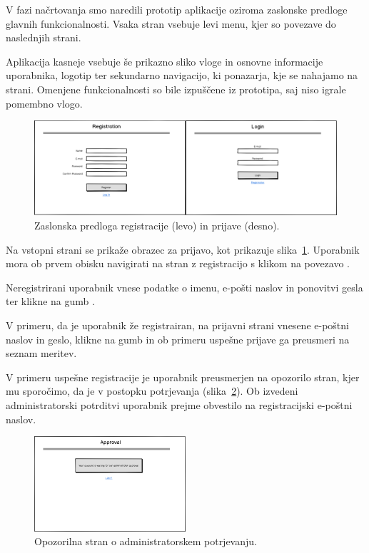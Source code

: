 \documentclass[a4paper, 12pt]{book}
\begin{document}
V fazi načrtovanja smo naredili prototip aplikacije oziroma zaslonske predloge glavnih funkcionalnosti. Vsaka stran vsebuje levi menu, kjer so povezave do naslednjih strani. 

Aplikacija kasneje vsebuje še prikazno sliko vloge in osnovne informacije uporabnika, logotip ter sekundarno navigacijo, ki ponazarja, kje se nahajamo na strani. Omenjene funkcionalnosti so bile izpuščene iz prototipa, saj niso igrale pomembno vlogo.

\begin{figure}[h]
\begin{center}
\includegraphics[width=\textwidth]{slike/registration_and_Login-wireframe.png}
\end{center}
\caption{Zaslonska predloga registracije (levo) in prijave (desno).}
\label{registration-login-wireframe}
\end{figure}

Na vstopni strani se prikaže obrazec za prijavo, kot prikazuje slika~\ref{registration-login-wireframe}. Uporabnik mora ob prvem obisku navigirati na stran z registracijo s klikom na povezavo .

Neregistrirani uporabnik vnese podatke o imenu, e-pošti naslov in ponovitvi gesla ter klikne na gumb .

V primeru, da je uporabnik že registrairan, na prijavni strani vnesene e-poštni naslov in geslo, klikne na gumb  in ob primeru uspešne prijave ga preusmeri na seznam meritev.


V primeru uspešne registracije je uporabnik preusmerjen na opozorilo stran, kjer mu sporočimo, da je v postopku potrjevanja (slika~\ref{approval-wireframe}).
Ob izvedeni administratorski potrditvi uporabnik prejme obvestilo na registracijski e-poštni naslov.

\begin{figure}[h]
\begin{center}
\includegraphics[width=0.5\textwidth]{slike/NotAlloved.png}
\end{center}
\caption{Opozorilna stran o administratorskem potrjevanju.}
\label{approval-wireframe}
\end{figure}
\end{document}
